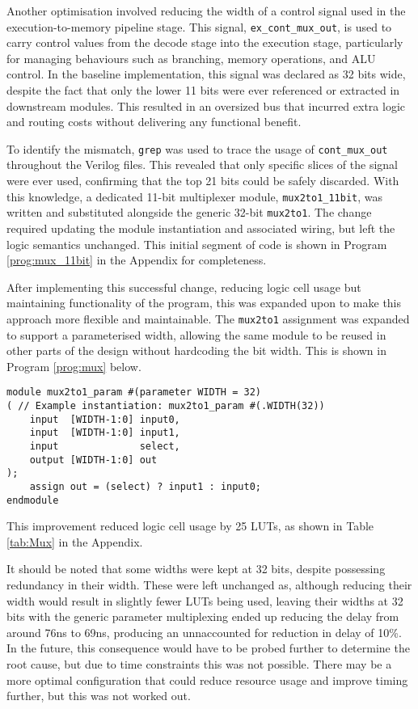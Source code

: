 \documentclass[a4paper,10pt]{article}
\begin{document}
Another optimisation involved reducing the width of a control signal used in 
the execution-to-memory pipeline stage. 
This signal, \texttt{ex\_cont\_mux\_out}, 
is used to carry control values from the decode 
stage into the execution stage, 
particularly for managing behaviours such as branching, memory operations, and ALU control. 
In the baseline implementation, this signal was declared as 32 bits wide, 
despite the fact that only the lower 11 bits 
were ever referenced or extracted in downstream modules. 
This resulted in an oversized bus that incurred extra logic and routing 
costs without delivering any functional benefit.

To identify the mismatch, \texttt{grep} was used to trace the usage of 
\texttt{cont\_mux\_out} throughout the Verilog files. 
This revealed that only specific slices of the signal were ever used, 
confirming that the top 21 bits could be safely discarded. 
With this knowledge, a dedicated 11-bit multiplexer module, 
\texttt{mux2to1\_11bit}, was written and substituted alongside the 
generic 32-bit \texttt{mux2to1}. 
The change required updating the 
module instantiation and associated wiring, 
but left the logic semantics unchanged.
This initial segment of code is shown in Program \ref{prog:mux_11bit}
in the Appendix for completeness.

After implementing this successful change, 
reducing logic cell usage but maintaining functionality of the program,
this was expanded upon to make this approach more flexible and maintainable.
The \texttt{mux2to1} assignment was expanded to support a parameterised width, 
allowing the same module to be reused in other parts of the design 
without hardcoding the bit width. 
This is shown in Program \ref{prog:mux} below.

\begin{lstlisting}[style=verilog-style, caption=
    {Generic width multiplexer}, label={prog:mux}]
module mux2to1_param #(parameter WIDTH = 32)
( // Example instantiation: mux2to1_param #(.WIDTH(32))
    input  [WIDTH-1:0] input0,
    input  [WIDTH-1:0] input1,
    input              select,
    output [WIDTH-1:0] out
);
    assign out = (select) ? input1 : input0;
endmodule
\end{lstlisting}

This improvement reduced logic cell usage by 25 LUTs, as shown in 
Table \ref{tab:Mux} in the Appendix.

It should be noted that some widths were kept at 32 bits,
despite possessing redundancy in their width.
These were left unchanged as, 
although reducing their width would result in slightly fewer LUTs being used,
leaving their widths at 32 bits with the generic parameter multiplexing 
ended up reducing the delay from around 76ns to 69ns,
producing an unnaccounted for reduction in delay of 10\%.
In the future, this consequence would have to be probed further
to determine the root cause, but due to time constraints this was not possible.
There may be a more optimal configuration that could reduce resource usage
and improve timing further, but this was not worked out.
\end{document}
